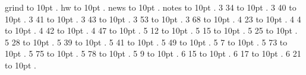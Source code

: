
\pdfpagewidth=148mm
\pdfpageheight=210mm
\hsize=128mm
\vsize=190mm

\pdfhorigin=0pt
\pdfvorigin=0pt
\hoffset=10mm
\voffset=10mm
\noindent grind \leaders\hbox to 10pt {\hss.\hss}  \hfill {}
\smallskip
\noindent hw \leaders\hbox to 10pt {\hss.\hss}  \hfill {}
\smallskip
\noindent news \leaders\hbox to 10pt {\hss.\hss}  \hfill {}
\smallskip
\noindent notes \leaders\hbox to 10pt {\hss.\hss}  \hfill {}
\smallskip
{} 3 34 \leaders\hbox to 10pt {\hss.\hss}  \hfill {}
\smallskip
{} 3 40 \leaders\hbox to 10pt {\hss.\hss}  \hfill {}
\smallskip
{} 3 41 \leaders\hbox to 10pt {\hss.\hss}  \hfill {}
\smallskip
{} 3 43 \leaders\hbox to 10pt {\hss.\hss}  \hfill {}
\smallskip
{} 3 53 \leaders\hbox to 10pt {\hss.\hss}  \hfill {}
\smallskip
{} 3 68 \leaders\hbox to 10pt {\hss.\hss}  \hfill {}
\smallskip
{} 4 23 \leaders\hbox to 10pt {\hss.\hss}  \hfill {}
\smallskip
{} 4 4 \leaders\hbox to 10pt {\hss.\hss}  \hfill {}
\smallskip
{} 4 42 \leaders\hbox to 10pt {\hss.\hss}  \hfill {}
\smallskip
{} 4 47 \leaders\hbox to 10pt {\hss.\hss}  \hfill {}
\smallskip
{} 5 12 \leaders\hbox to 10pt {\hss.\hss}  \hfill {}
\smallskip
{} 5 15 \leaders\hbox to 10pt {\hss.\hss}  \hfill {}
\smallskip
{} 5 25 \leaders\hbox to 10pt {\hss.\hss}  \hfill {}
\smallskip
{} 5 28 \leaders\hbox to 10pt {\hss.\hss}  \hfill {}
\smallskip
{} 5 39 \leaders\hbox to 10pt {\hss.\hss}  \hfill {}
\smallskip
{} 5 41 \leaders\hbox to 10pt {\hss.\hss}  \hfill {}
\smallskip
{} 5 49 \leaders\hbox to 10pt {\hss.\hss}  \hfill {}
\smallskip
{} 5 7 \leaders\hbox to 10pt {\hss.\hss}  \hfill {}
\smallskip
{} 5 73 \leaders\hbox to 10pt {\hss.\hss}  \hfill {}
\smallskip
{} 5 75 \leaders\hbox to 10pt {\hss.\hss}  \hfill {}
\smallskip
{} 5 78 \leaders\hbox to 10pt {\hss.\hss}  \hfill {}
\smallskip
{} 5 9 \leaders\hbox to 10pt {\hss.\hss}  \hfill {}
\smallskip
{} 6 15 \leaders\hbox to 10pt {\hss.\hss}  \hfill {}
\smallskip
{} 6 17 \leaders\hbox to 10pt {\hss.\hss}  \hfill {}
\smallskip
{} 6 21 \leaders\hbox to 10pt {\hss.\hss}  \hfill {}
\smallskip
